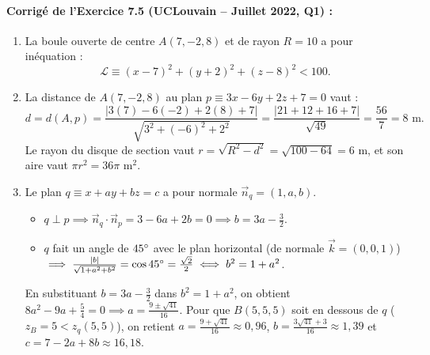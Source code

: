 \paragraph{Corrigé de l'Exercice 7.5 (UCLouvain -- Juillet 2022, Q1) :}
\begin{enumerate}[label=(\alph*)]
    \item La boule ouverte de centre $A(7, -2, 8)$ et de rayon $R = 10$ a pour inéquation :
    \[
        \boxed{\mathcal{L} \equiv (x - 7)^2 + (y + 2)^2 + (z - 8)^2 < 100}.
    \]
    \item La distance de $A(7, -2, 8)$ au plan $p \equiv 3x - 6y + 2z + 7 = 0$ vaut :
    \[
        d = d(A, p) = \frac{|3(7) - 6(-2) + 2(8) + 7|}{\sqrt{3^2 + (-6)^2 + 2^2}} = \frac{|21 + 12 + 16 + 7|}{\sqrt{49}} = \frac{56}{7} = 8\text{ m}.
    \]
    Le rayon du disque de section vaut $r = \sqrt{R^2 - d^2} = \sqrt{100 - 64} = 6\text{ m}$, et son aire vaut $\pi r^2 = \boxed{36\pi\text{ m}^2}$.
    \item Le plan $q \equiv x + ay + bz = c$ a pour normale $\vec{n}_q = (1, a, b)$.
    \begin{itemize}
        \item $q \perp p \implies \vec{n}_q \cdot \vec{n}_p = 3 - 6a + 2b = 0 \implies b = 3a - \frac{3}{2}$.
        \item $q$ fait un angle de $45\degree$ avec le plan horizontal (de normale $\vec{k} = (0,0,1)$) $\implies \frac{|b|}{\sqrt{1+a^2+b^2}} = \cos 45\degree = \frac{\sqrt{2}}{2} \iff b^2 = 1 + a^2$.
    \end{itemize}
    En substituant $b = 3a - \frac{3}{2}$ dans $b^2 = 1 + a^2$, on obtient $8a^2 - 9a + \frac{5}{4} = 0 \implies a = \frac{9 \pm \sqrt{41}}{16}$. Pour que $B(5,5,5)$ soit en dessous de $q$ ($z_B = 5 < z_q(5,5)$), on retient $a = \frac{9+\sqrt{41}}{16} \approx 0,96$, $b = \frac{3\sqrt{41}+3}{16} \approx 1,39$ et $c = 7 - 2a + 8b \approx 16,18$.
\end{enumerate}

